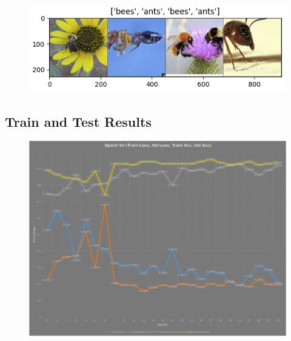 \documentclass[12pt]{article}
\begin{document}
			\begin{figure}[h]
				\centering
				\includegraphics[width=12cm]{Figure_1.png}
				\label{fig:sub1}
			\end{figure}
		
		\subsection{Train and Test Results}
			\begin{figure}[h]
				\includegraphics[width=13cm]{Plot_1.png}
				\captionsetup{justification=centering,margin=1cm}
				\label{fig:sub1}
			\end{figure}
		
\end{document}
